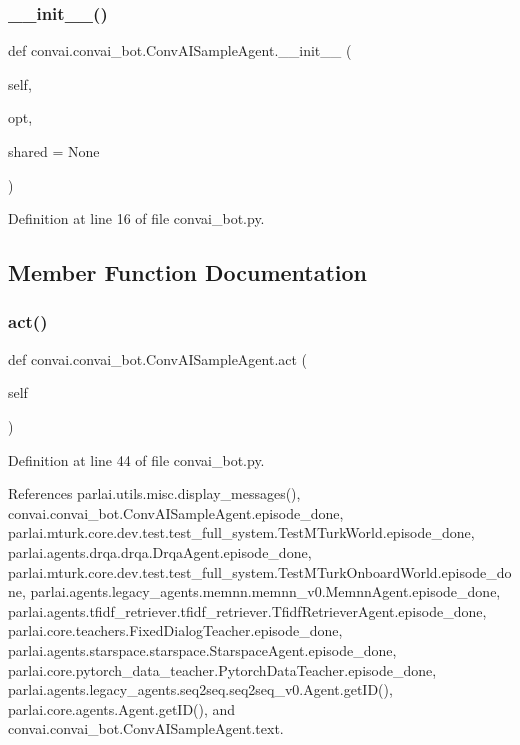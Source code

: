 \subsubsection{\texorpdfstring{\+\_\+\+\_\+init\+\_\+\+\_\+()}{\_\_init\_\_()}}
{\footnotesize\ttfamily def convai.\+convai\+\_\+bot.\+Conv\+A\+I\+Sample\+Agent.\+\_\+\+\_\+init\+\_\+\+\_\+ (\begin{DoxyParamCaption}\item[{}]{self,  }\item[{}]{opt,  }\item[{}]{shared = {\ttfamily None} }\end{DoxyParamCaption})}



Definition at line 16 of file convai\+\_\+bot.\+py.



\subsection{Member Function Documentation}
\mbox{\label{classconvai_1_1convai__bot_1_1ConvAISampleAgent_ad8645a69c3fcbefb4863bf9ebbff3d0c}} 
\subsubsection{\texorpdfstring{act()}{act()}}
{\footnotesize\ttfamily def convai.\+convai\+\_\+bot.\+Conv\+A\+I\+Sample\+Agent.\+act (\begin{DoxyParamCaption}\item[{}]{self }\end{DoxyParamCaption})}



Definition at line 44 of file convai\+\_\+bot.\+py.



References parlai.\+utils.\+misc.\+display\+\_\+messages(), convai.\+convai\+\_\+bot.\+Conv\+A\+I\+Sample\+Agent.\+episode\+\_\+done, parlai.\+mturk.\+core.\+dev.\+test.\+test\+\_\+full\+\_\+system.\+Test\+M\+Turk\+World.\+episode\+\_\+done, parlai.\+agents.\+drqa.\+drqa.\+Drqa\+Agent.\+episode\+\_\+done, parlai.\+mturk.\+core.\+dev.\+test.\+test\+\_\+full\+\_\+system.\+Test\+M\+Turk\+Onboard\+World.\+episode\+\_\+done, parlai.\+agents.\+legacy\+\_\+agents.\+memnn.\+memnn\+\_\+v0.\+Memnn\+Agent.\+episode\+\_\+done, parlai.\+agents.\+tfidf\+\_\+retriever.\+tfidf\+\_\+retriever.\+Tfidf\+Retriever\+Agent.\+episode\+\_\+done, parlai.\+core.\+teachers.\+Fixed\+Dialog\+Teacher.\+episode\+\_\+done, parlai.\+agents.\+starspace.\+starspace.\+Starspace\+Agent.\+episode\+\_\+done, parlai.\+core.\+pytorch\+\_\+data\+\_\+teacher.\+Pytorch\+Data\+Teacher.\+episode\+\_\+done, parlai.\+agents.\+legacy\+\_\+agents.\+seq2seq.\+seq2seq\+\_\+v0.\+Agent.\+get\+I\+D(), parlai.\+core.\+agents.\+Agent.\+get\+I\+D(), and convai.\+convai\+\_\+bot.\+Conv\+A\+I\+Sample\+Agent.\+text.

